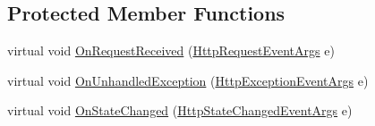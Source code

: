 \subsection*{Protected Member Functions}
\begin{DoxyCompactItemize}
\item 
virtual void \hyperlink{class_p_http_1_1_http_server_ad1ecd530bcb727c89b9fca95697f8164}{On\+Request\+Received} (\hyperlink{class_p_http_1_1_http_request_event_args}{Http\+Request\+Event\+Args} e)
\item 
virtual void \hyperlink{class_p_http_1_1_http_server_af02e111fabc1f125e635f7e68d86a331}{On\+Unhandled\+Exception} (\hyperlink{class_p_http_1_1_http_exception_event_args}{Http\+Exception\+Event\+Args} e)
\item 
virtual void \hyperlink{class_p_http_1_1_http_server_a6e6dc47371f1de693f841d86bd4fc13f}{On\+State\+Changed} (\hyperlink{class_p_http_1_1_http_state_changed_event_args}{Http\+State\+Changed\+Event\+Args} e)
\end{DoxyCompactItemize}

